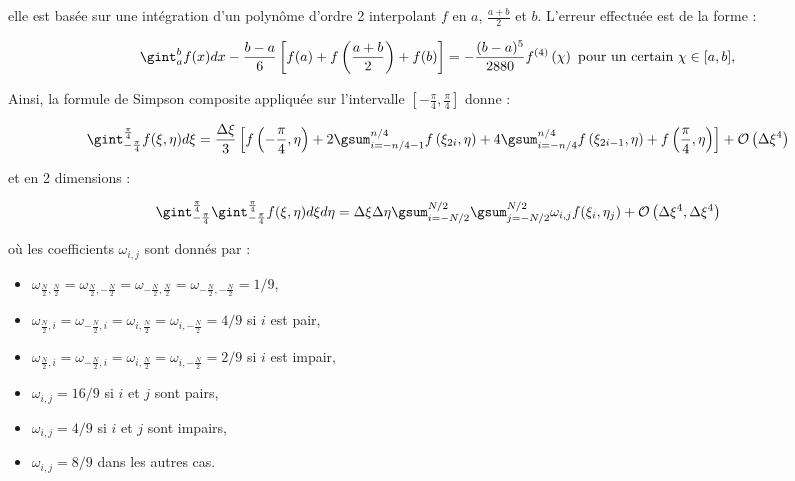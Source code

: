 elle est basée sur une intégration d'un polynôme d'ordre 2 interpolant $f$ en $a$, $\frac{a+b}{2}$ et $b$.
L'erreur effectuée est de la forme :

\begin{equation}
\gint_a^b f(x)dx - \dfrac{b-a}{6} \left[ f(a)+f\left(\dfrac{a+b}{2}\right) + f(b) \right] = - \dfrac{(b-a)^5}{2880}f^{(4)}\left( \chi \right) \text{ pour un certain } \chi \in [a,b],
\end{equation}

Ainsi, la formule de Simpson composite appliquée sur l'intervalle $\left[ - \frac{\pi}{4}, \frac{\pi}{4} \right]$ donne :

\begin{equation}
\gint_{-\frac{\pi}{4}}^{\frac{\pi}{4}} f(\xi, \eta) d\xi = \dfrac{\Delta \xi}{3} \left[ f\left( - \dfrac{\pi}{4}, \eta \right) + 2 \gsum_{i=-n/4-1}^{n/4} f\left( \xi_{2i}, \eta \right) + 4\gsum_{i=-n/4}^{n/4} f\left( \xi_{2i-1}, \eta \right) + f \left( \dfrac{\pi}{4}, \eta \right) \right] + \mathcal{O}\left( \Delta \xi^4 \right)
\end{equation}

et en 2 dimensions :

\begin{equation}
\gint_{-\frac{\pi}{4}}^{\frac{\pi}{4}} \gint_{-\frac{\pi}{4}}^{\frac{\pi}{4}} f(\xi, \eta) d\xi  d\eta= \Delta\xi \Delta \eta \gsum_{i=-N/2}^{N/2}\gsum_{j=-N/2}^{N/2} \omega_{i,j} f(\xi_i, \eta_j) + \mathcal{O}\left( \Delta \xi^4, \Delta \xi^4 \right)
\label{eq:simpson 2d}
\end{equation}

où les coefficients $\omega_{i,j}$ sont donnés par :
\begin{itemize}
\item $\omega_{\frac{N}{2},\frac{N}{2}}=\omega_{\frac{N}{2},-\frac{N}{2}}=\omega_{-\frac{N}{2},\frac{N}{2}}=\omega_{-\frac{N}{2},-\frac{N}{2}}=1/9$,
\item $\omega_{\frac{N}{2},i}=\omega_{-\frac{N}{2},i}=\omega_{i,\frac{N}{2}}=\omega_{i,-\frac{N}{2}}=4/9$ si $i$ est pair,
\item $\omega_{\frac{N}{2},i}=\omega_{-\frac{N}{2},i}=\omega_{i,\frac{N}{2}}=\omega_{i,-\frac{N}{2}}=2/9$ si $i$ est impair,
\item $\omega_{i,j}=16/9$ si $i$ et $j$ sont pairs,
\item $\omega_{i,j}=4/9$ si $i$ et $j$ sont impairs,
\item $\omega_{i,j}=8/9$ dans les autres cas.
\end{itemize}



